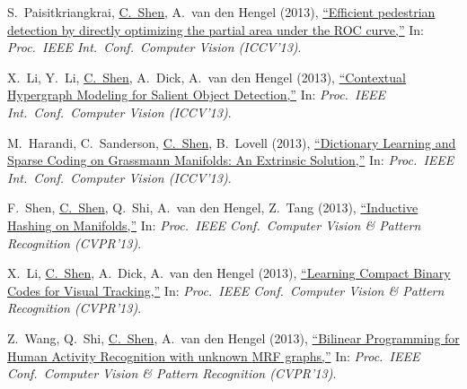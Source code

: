 \documentclass[9pt, a4paper]{article}
\newcommand{\years}[1]{\marginnote{\scriptsize #1}}
\def\highlight{\uline}
\begin{document}
\years{2013} S.~Paisitkriangkrai, \highlight{C.~Shen}, A.~van den Hengel (2013),
\href{http://www.google.com/search?lr=&ie=UTF-8&oe=UTF-8&q=Efficient+pedestrian+detection+by+directly+optimizing+the+partial+area+under+the+ROC+curve+Sakrapee+Paisitkriangkrai%2C+Chunhua+Shen%2C+Anton+van+den+Hengel}{``Efficient pedestrian detection by directly optimizing the partial area under the {ROC} curve,{}''}
In: \emph{Proc.\ IEEE Int.\ Conf.\  Computer Vision (ICCV'13)}.

\medskip

\years{2013} X.~Li, Y.~Li, \highlight{C.~Shen}, A.~Dick, A.~van den Hengel (2013),
\href{http://www.google.com/search?lr=&ie=UTF-8&oe=UTF-8&q=Contextual+Hypergraph+Modeling+for+Salient+Object+Detection+Xi+Li%2C+Yao+Li%2C+Chunhua+Shen%2C+Anthony+Dick%2C+Anton+van+den+Hengel}{``Contextual Hypergraph Modeling for Salient Object Detection,{}''}
In: \emph{Proc.\ IEEE Int.\ Conf.\  Computer Vision (ICCV'13)}.

\medskip

\years{2013} M.~Harandi, C.~Sanderson, \highlight{C.~Shen}, B.~Lovell (2013),
\href{http://www.google.com/search?lr=&ie=UTF-8&oe=UTF-8&q=Dictionary+Learning+and+Sparse+Coding+on+Grassmann+Manifolds%3A+An+Extrinsic+Solution+Mehrtash+Harandi%2C+Conrad+Sanderson%2C+Chunhua+Shen%2C+Brian+Lovell}{``Dictionary Learning and Sparse Coding on {G}rassmann Manifolds: An Extrinsic Solution,{}''}
In: \emph{Proc.\ IEEE Int.\ Conf.\  Computer Vision (ICCV'13)}.

\medskip

\years{2013} F.~Shen, \highlight{C.~Shen}, Q.~Shi, A.~van den Hengel, Z.~Tang (2013),
\href{http://www.google.com/search?lr=&ie=UTF-8&oe=UTF-8&q=Inductive+Hashing+on+Manifolds+Fumin+Shen%2C+Chunhua+Shen%2C+Qinfeng+Shi%2C+Anton+van+den+Hengel%2C+Zhenmin+Tang}{``Inductive Hashing on Manifolds,{}''}
In: \emph{Proc.\ IEEE Conf.\  Computer Vision \& Pattern Recognition (CVPR'13)}.

\medskip

\years{2013} X.~Li, \highlight{C.~Shen}, A.~Dick, A.~van den Hengel (2013),
\href{http://www.google.com/search?lr=&ie=UTF-8&oe=UTF-8&q=Learning+Compact+Binary+Codes+for+Visual+Tracking+Xi+Li%2C+Chunhua+Shen%2C+Anthony+Dick%2C+Anton+van+den+Hengel}{``Learning Compact Binary Codes for Visual Tracking,{}''}
In: \emph{Proc.\ IEEE Conf.\  Computer Vision \& Pattern Recognition (CVPR'13)}.

\medskip

\years{2013} Z.~Wang, Q.~Shi, \highlight{C.~Shen}, A.~van den Hengel (2013),
\href{http://www.google.com/search?lr=&ie=UTF-8&oe=UTF-8&q=Bilinear+Programming+for+Human+Activity+Recognition+with+unknown+MRF+graphs+Zhenhua+Wang%2C+Qinfeng+Shi%2C+Chunhua+Shen%2C+Anton+van+den+Hengel}{``Bilinear Programming for Human Activity Recognition with unknown {MRF} graphs,{}''}
In: \emph{Proc.\ IEEE Conf.\  Computer Vision \& Pattern Recognition (CVPR'13)}.
\end{document}
